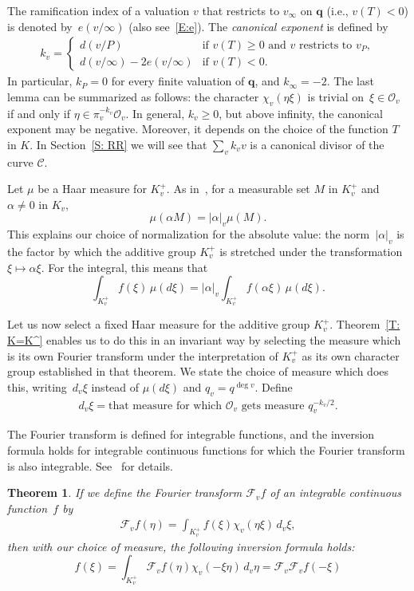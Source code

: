 \documentclass{amsart}
\newcommand\q{\mathbf{q}}
\newcommand\oo{\mathcal{O}}
\newcommand\Curve{\mathcal{C}}
\newcommand\Fo{\mathcal{F}}
\newtheorem{theorem}{Theorem}[section]
\theoremstyle{definition}\newtheorem{definition}[theorem]{Definition}
\theoremstyle{remark}\newtheorem{remark}[theorem]{Remark}
\numberwithin{equation}{section}
\begin{document}
The ramification index of a valuation $v$ that restricts to $v_\infty$ on $\q$ (i.e.,
$v(T)<0$) is denoted by~$e(v/\infty)$ (also see~\eqref{E:e}).
The {\em canonical exponent\/} is defined by
\begin{gather}\label{E: kv}
k_v=\begin{cases}
d(v/P)&\text{if }v(T)\geq0\text{ and $v$ restricts to }v_P,\\
d(v/\infty)-2e(v/\infty)&\text{if }v(T)<0.
\end{cases}
\end{gather}
In particular,
$k_P=0$ for every finite valuation of $\q$,
and $k_\infty=-2$.
The last lemma can be summarized as follows:
the character $\chi_v(\eta\xi)$ is trivial on~\mbox{$\xi\in\oo_v$} if and only if $\eta\in\pi_v^{-k_v}\oo_v$.
In general,
$k_v\geq0$,
but above infinity,
 the canonical exponent may be negative.
Moreover,
it depends on the choice of the function $T$ in $K$.
In Section~\ref{S: RR} we will see that $\sum_vk_vv$ is a canonical divisor of the curve $\Curve$.\medskip

Let $\mu$ be a Haar measure for $K_v^+$.
As in~\cite[Lemmas~2.2.4 and~2.2.5]{Tate},
for a measurable set $M$ in $K_v^+$ and $\alpha\neq0$ in $K_v$,
$$
\mu(\alpha M)=|\alpha|_v\mu(M).
$$
This explains our choice of normalization for the absolute value:
the norm~$|\alpha|_v$ is the factor by which the additive group $K_v^+$ is stretched under the transformation $\xi\mapsto\alpha\xi$.
For the integral,
this means that
$$
\int_{K_v^+} f(\xi)\,\mu(d\xi)=|\alpha|_v\int_{K_v^+} f(\alpha\xi)\,\mu(d\xi).
$$

Let us now select a fixed Haar measure for the additive group $K_v^+$.
Theorem~\ref{T: K=K^} enables us to do this in an invariant way by selecting the measure which is its own Fourier transform under the interpretation of $K_v^+$ as its own character group established in that theorem.
We state the choice of measure which does this,
writing~$d_v\xi$ instead of $\mu(d\xi)$ and $q_v=q^{\deg v}$.
Define
\begin{gather*}
d_v\xi=\text{that measure for which }\oo_v\text{ gets measure }q_v^{-k_v/2}.
\end{gather*}

The Fourier transform is defined for integrable functions,
and the inversion formula holds for integrable continuous functions for which the Fourier transform is also integrable.
See~\cite[Theorem~2.2.2]{Tate} for details.

\begin{theorem}
If we define the Fourier transform $\Fo_vf$ of an integrable continuous function~$f$ by
\begin{gather}\label{E:F_v}
\Fo_v f(\eta)=\int_{K_v^+}f(\xi)\chi_v(\eta\xi)\,d_v\xi,
\end{gather}
then with our choice of measure,
the following inversion formula holds:
$$
f(\xi)=\int_{K_v^+}\Fo_v f(\eta)\chi_v(-\xi\eta)\,d_v\eta=\Fo_v\Fo_v f(-\xi)
$$
\end{theorem}
\end{document}
